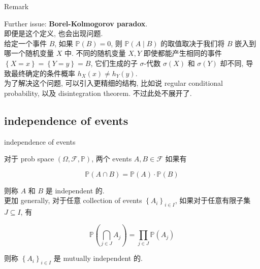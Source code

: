 \documentclass{qlnotes-export}
\begin{document}
\begin{qlremark}{Remark}

Further issue: \textbf{Borel-Kolmogorov paradox}.\\
即便是这个定义, 也会出现问题.\\
给定一个事件 \(B\), 如果 \({\mathbb{P}}(B) = 0\), 则 \({\mathbb{P}}(A \mid B)\) 的取值取决于我们将 \(B\) 嵌入到哪一个随机变量 \(X\) 中. 不同的随机变量 \(X,Y\) 即使都能产生相同的事件 \(\left\{ {X = x} \right\} = \left\{ {Y = y} \right\} = B\), 它们生成的子 \(\sigma\)-代数 \(\sigma(X)\) 和 \(\sigma(Y)\) 却不同, 导致最终确定的条件概率 \(h_{X}(x) \neq h_{Y}(y)\).\\
为了解决这个问题, 可以引入更精细的结构, 比如说 regular conditional probability, 以及 disintegration theorem. 不过此处不展开了.

\end{qlremark}

\subsection{independence of events}\label{independence-of-events}

\begin{definition}{independence of events}\label{def-01-combinatorics-prob-space-independence-of-events}

对于 prob space \((\Omega,\mathcal{F},{\mathbb{P}})\), 两个 events \(A,B \in \mathcal{F}\) 如果有

\[{\mathbb{P}}(A \cap B) = {\mathbb{P}}(A) \cdot {\mathbb{P}}(B)\]

则称 \(A\) 和 \(B\) 是 independent 的.\\
更加 generally, 对于任意 collection of events \(\left\{ A_{i} \right\}_{i \in I}\), 如果对于任意有限子集 \(J \subseteq I\), 有

\[{\mathbb{P}}\left( {\bigcap\limits_{j \in J}A_{j}} \right) = \prod\limits_{j \in J}{\mathbb{P}}(A_{j})\]

则称 \(\left\{ A_{i} \right\}_{i \in I}\) 是 mutually independent 的.

\end{definition}
\end{document}

